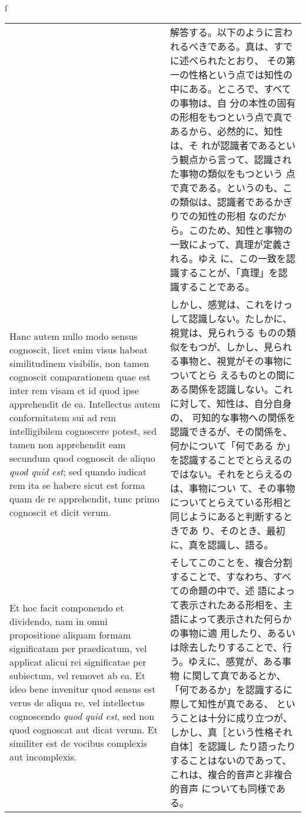 \\f\documentclass[10pt]{jsarticle} %
\begin{document}
\begin{longtable}{p{21em}p{21em}}
& 

解答する。以下のように言われるべきである。真は、すでに述べられたとおり、
その第一の性格という点では知性の中にある。ところで、すべての事物は、自
分の本性の固有の形相をもつという点で真であるから、必然的に、知性は、そ
れが認識者であるという観点から言って、認識された事物の類似をもつという
点で真である。というのも、この類似は、認識者であるかぎりでの知性の形相
なのだから。このため、知性と事物の一致によって、真理が定義される。ゆえ
に、この一致を認識することが、「真理」を認識することである。


\\


Hanc autem nullo modo sensus cognoscit, licet enim visus habeat
similitudinem visibilis, non tamen cognoscit comparationem quae est
inter rem visam et id quod ipse apprehendit de ea. Intellectus autem
conformitatem sui ad rem intelligibilem cognoscere potest, sed tamen
non apprehendit eam secundum quod cognoscit de aliquo {\itshape quod
quid est}; sed quando iudicat rem ita se habere sicut est forma quam
de re apprehendit, tunc primo cognoscit et dicit verum.


&

しかし、感覚は、これをけっして認識しない。たしかに、視覚は、見られうる
ものの類似をもつが、しかし、見られる事物と、視覚がその事物についてとら
えるものとの間にある関係を認識しない。これに対して、知性は、自分自身の、
可知的な事物への関係を認識できるが、その関係を、何かについて「何である
か」を認識することでとらえるのではない。それをとらえるのは、事物につい
て、その事物についてとらえている形相と同じようにあると判断するときであ
り、そのとき、最初に、真を認識し、語る。


\\


Et hoc facit componendo et dividendo, nam in omni propositione aliquam
formam significatam per praedicatum, vel applicat alicui rei
significatae per subiectum, vel removet ab ea. Et ideo bene invenitur
quod sensus est verus de aliqua re, vel intellectus cognoscendo
{\itshape quod quid est}, sed non quod cognoscat aut dicat verum. Et
similiter est de vocibus complexis aut incomplexis.


&

そしてこのことを、複合分割することで、すなわち、すべての命題の中で、述
語によって表示されたある形相を、主語によって表示された何らかの事物に適
用したり、あるいは除去したりすることで、行う。ゆえに、感覚が、ある事物
に関して真であるとか、「何であるか」を認識するに際して知性が真である、
ということは十分に成り立つが、しかし、真［という性格それ自体］を認識し
たり語ったりすることはないのであって、これは、複合的音声と非複合的音声
についても同様である。


\end{longtable}
\end{document}

